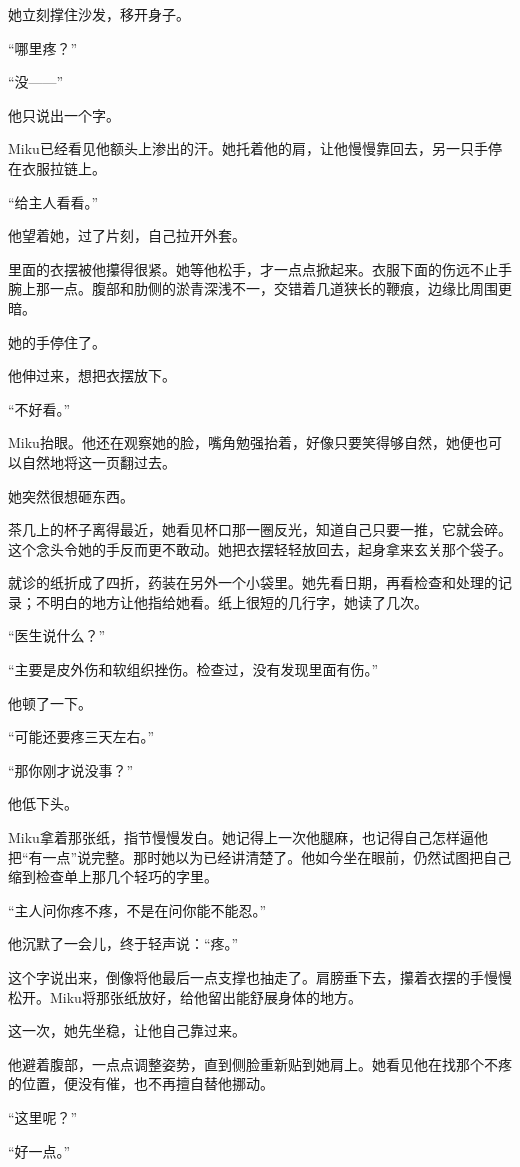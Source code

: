 她立刻撑住沙发，移开身子。

“哪里疼？”

“没——”

他只说出一个字。

Miku已经看见他额头上渗出的汗。她托着他的肩，让他慢慢靠回去，另一只手停在衣服拉链上。

“给主人看看。”

他望着她，过了片刻，自己拉开外套。

里面的衣摆被他攥得很紧。她等他松手，才一点点掀起来。衣服下面的伤远不止手腕上那一点。腹部和肋侧的淤青深浅不一，交错着几道狭长的鞭痕，边缘比周围更暗。

她的手停住了。

他伸过来，想把衣摆放下。

“不好看。”

Miku抬眼。他还在观察她的脸，嘴角勉强抬着，好像只要笑得够自然，她便也可以自然地将这一页翻过去。

她突然很想砸东西。

茶几上的杯子离得最近，她看见杯口那一圈反光，知道自己只要一推，它就会碎。这个念头令她的手反而更不敢动。她把衣摆轻轻放回去，起身拿来玄关那个袋子。

就诊的纸折成了四折，药装在另外一个小袋里。她先看日期，再看检查和处理的记录；不明白的地方让他指给她看。纸上很短的几行字，她读了几次。

“医生说什么？”

“主要是皮外伤和软组织挫伤。检查过，没有发现里面有伤。”

他顿了一下。

“可能还要疼三天左右。”

“那你刚才说没事？”

他低下头。

Miku拿着那张纸，指节慢慢发白。她记得上一次他腿麻，也记得自己怎样逼他把“有一点”说完整。那时她以为已经讲清楚了。他如今坐在眼前，仍然试图把自己缩到检查单上那几个轻巧的字里。

“主人问你疼不疼，不是在问你能不能忍。”

他沉默了一会儿，终于轻声说：“疼。”

这个字说出来，倒像将他最后一点支撑也抽走了。肩膀垂下去，攥着衣摆的手慢慢松开。Miku将那张纸放好，给他留出能舒展身体的地方。

这一次，她先坐稳，让他自己靠过来。

他避着腹部，一点点调整姿势，直到侧脸重新贴到她肩上。她看见他在找那个不疼的位置，便没有催，也不再擅自替他挪动。

“这里呢？”

“好一点。”

